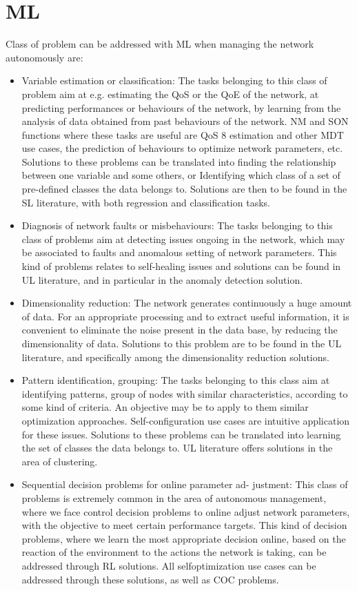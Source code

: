 \documentclass[12pt]{article}
\begin{document}
\section{ML}
Class of problem can be addressed with ML when managing the network autonomously are:
\begin{itemize}
	\item Variable estimation or classification: The tasks belonging
	to this class of problem aim at e.g. estimating the QoS
	or the QoE of the network, at predicting performances or
	behaviours of the network, by learning from the analysis
	of data obtained from past behaviours of the network. NM
	and SON functions where these tasks are useful are QoS
	8
	estimation and other MDT use cases, the prediction of
	behaviours to optimize network parameters, etc. Solutions
	to these problems can be translated into finding the
	relationship between one variable and some others, or
	Identifying which class of a set of pre-defined classes
	the data belongs to. Solutions are then to be found in
	the SL literature, with both regression and classification
	tasks.
	\item Diagnosis of network faults or misbehaviours: The tasks
	belonging to this class of problems aim at detecting issues
	ongoing in the network, which may be associated to faults
	and anomalous setting of network parameters. This kind
	of problems relates to self-healing issues and solutions
	can be found in UL literature, and in particular in the
	anomaly detection solution.
	\item Dimensionality reduction: The network generates continuously
	a huge amount of data. For an appropriate processing
	and to extract useful information, it is convenient to
	eliminate the noise present in the data base, by reducing
	the dimensionality of data. Solutions to this problem are
	to be found in the UL literature, and specifically among
	the dimensionality reduction solutions.
	\item Pattern identification, grouping: The tasks belonging to
	this class aim at identifying patterns, group of nodes
	with similar characteristics, according to some kind of
	criteria. An objective may be to apply to them similar
	optimization approaches. Self-configuration use cases are
	intuitive application for these issues. Solutions to these
	problems can be translated into learning the set of classes
	the data belongs to. UL literature offers solutions in the
	area of clustering.
	\item  Sequential decision problems for online parameter ad-
	justment: This class of problems is extremely common
	in the area of autonomous management, where we face
	control decision problems to online adjust network parameters,
	with the objective to meet certain performance
	targets. This kind of decision problems, where we learn
	the most appropriate decision online, based on the reaction
	of the environment to the actions the network is
	taking, can be addressed through RL solutions. All selfoptimization
	use cases can be addressed through these
	solutions, as well as COC problems.
\end{itemize}
\end{document}
